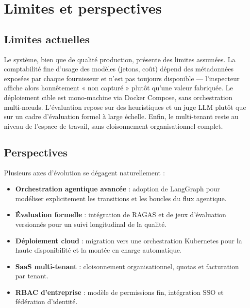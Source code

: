 \documentclass[12pt,a4paper,oneside]{report}
\begin{document}
\chapter*{Limites et perspectives}

\section*{Limites actuelles}
Le système, bien que de qualité production, présente des limites assumées. La
comptabilité fine d'usage des modèles (jetons, coût) dépend des métadonnées
exposées par chaque fournisseur et n'est pas toujours disponible — l'inspecteur
affiche alors honnêtement « non capturé » plutôt qu'une valeur fabriquée. Le
déploiement cible est mono-machine via Docker Compose, sans orchestration
multi-n{\oe}uds. L'évaluation repose sur des heuristiques et un juge LLM plutôt
que sur un cadre d'évaluation formel à large échelle. Enfin, le multi-tenant reste
au niveau de l'espace de travail, sans cloisonnement organisationnel complet.

\section*{Perspectives}
Plusieurs axes d'évolution se dégagent naturellement :
\begin{itemize}[leftmargin=*]
  \item \textbf{Orchestration agentique avancée} : adoption de LangGraph pour
  modéliser explicitement les transitions et les boucles du flux agentique.
  \item \textbf{Évaluation formelle} : intégration de RAGAS et de jeux
  d'évaluation versionnés pour un suivi longitudinal de la qualité.
  \item \textbf{Déploiement cloud} : migration vers une orchestration Kubernetes
  pour la haute disponibilité et la montée en charge automatique.
  \item \textbf{SaaS multi-tenant} : cloisonnement organisationnel, quotas et
  facturation par tenant.
  \item \textbf{RBAC d'entreprise} : modèle de permissions fin, intégration SSO
  et fédération d'identité.
\end{itemize}

\end{document}
